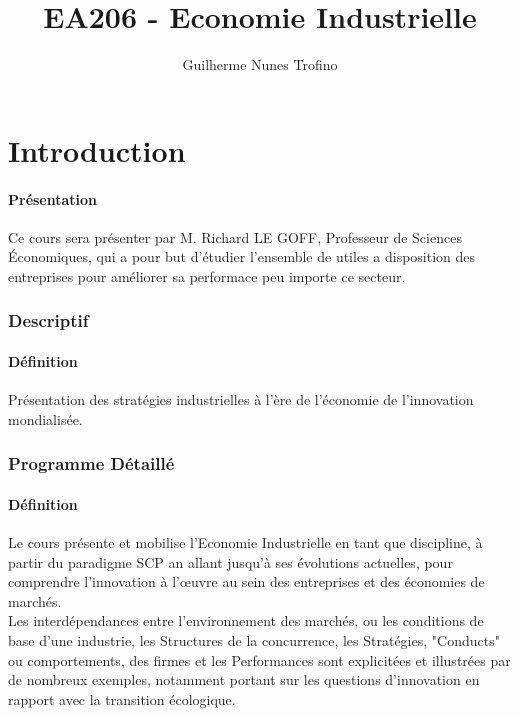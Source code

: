 \documentclass{article}
\title{EA206 - Economie Industrielle}
\author{Guilherme Nunes Trofino}
\begin{document}
\maketitle

\newpage\tableofcontents
\section{Introduction}

% 
\paragraph{Présentation}Ce cours sera présenter par M. Richard LE GOFF, Professeur de Sciences Économiques, qui a pour but d'étudier l'ensemble de utiles a disposition des entreprises pour améliorer sa performace peu importe ce secteur.

\subsubsection{Descriptif}
\paragraph{Définition}Présentation des stratégies industrielles à l'ère de l'économie de l'innovation mondialisée.

\subsubsection{Programme Détaillé}
\paragraph{Définition}Le cours présente et mobilise l'Economie Industrielle en tant que discipline, à partir du paradigme SCP an allant jusqu'à ses évolutions actuelles, pour comprendre l'innovation à l'œuvre au sein des entreprises et des économies de marchés.\\

\noindent Les interdépendances entre l'environnement des marchés, ou les conditions de base d'une industrie, les Structures de la concurrence, les Stratégies, "Conducts" ou comportements, des firmes et les Performances sont explicitées et illustrées par de nombreux exemples, notamment portant sur les questions d'innovation en rapport avec la transition écologique.
\end{document}
